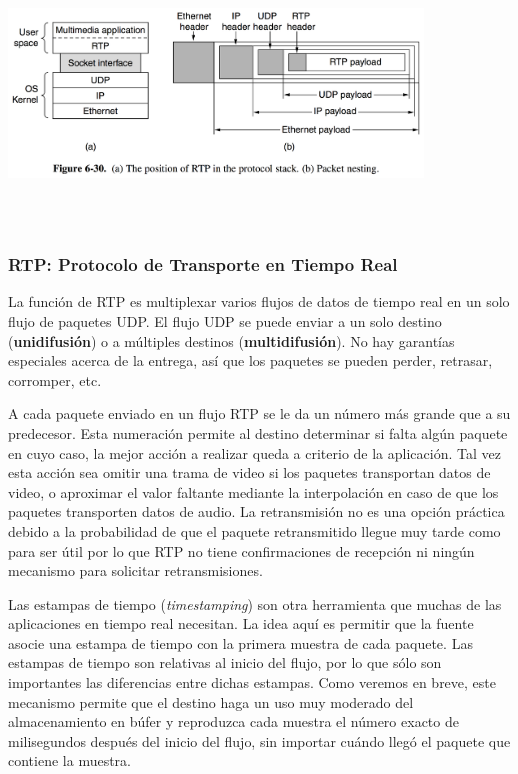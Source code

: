 \documentclass[10pt,a4paper]{report}
\begin{document}
	\begin{center}
		\includegraphics[width=11cm, height=7cm]{./imagenes/tiemporeal.png} 
	\end{center}

\subsubsection{RTP: Protocolo de Transporte en Tiempo Real}

	\par La función de RTP es multiplexar varios flujos de datos de tiempo real en un solo flujo de paquetes UDP. El flujo UDP se puede enviar a un solo destino (\textbf{unidifusión}) o a múltiples destinos (\textbf{multidifusión}). No hay garantías especiales acerca de la entrega, así que los paquetes se pueden perder, retrasar, corromper, etc.
		
	\par A cada paquete enviado en un flujo RTP se le da un número más grande que a su predecesor. Esta numeración permite al destino determinar si falta algún paquete en cuyo caso, la mejor acción a realizar queda a criterio de la aplicación. Tal vez esta acción sea omitir una trama de video si los paquetes transportan datos de video, o aproximar el valor faltante mediante la interpolación en caso de que los paquetes transporten datos de audio. La retransmisión no es una opción práctica debido a la probabilidad de que el paquete retransmitido llegue muy tarde como para ser útil por lo que RTP no tiene confirmaciones de recepción ni ningún mecanismo para solicitar retransmisiones.

	\par Las estampas de tiempo (\textit{timestamping}) son otra herramienta que muchas de las aplicaciones en tiempo real necesitan. La idea aquí es permitir que la fuente asocie una estampa de tiempo con la primera muestra de cada paquete. Las estampas de tiempo son relativas al inicio del flujo, por lo que sólo son importantes las diferencias entre dichas estampas. Como veremos en breve, este mecanismo permite que el destino haga un uso muy moderado del almacenamiento en búfer y reproduzca cada muestra el número exacto de milisegundos después del inicio del flujo, sin importar cuándo llegó el paquete que contiene la muestra.
	
\end{document}
